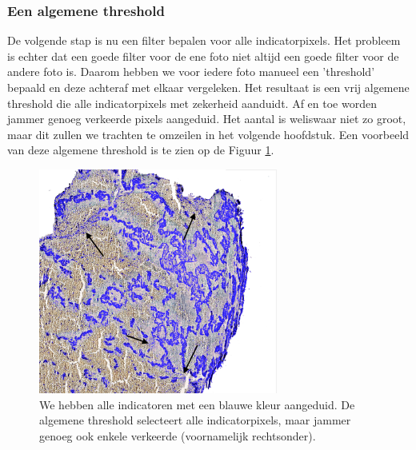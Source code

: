\documentclass[a4paper,kulak]{kulakarticle}
\begin{document}
	\subsubsection{Een algemene threshold}
		De volgende stap is nu een filter bepalen voor alle indicatorpixels. Het probleem is echter dat een goede filter voor de ene foto niet altijd een goede filter voor de andere foto is. Daarom hebben we voor iedere foto manueel een 'threshold' bepaald en deze achteraf met elkaar vergeleken. Het resultaat is een vrij algemene threshold die alle indicatorpixels met zekerheid aanduidt. Af en toe worden jammer genoeg verkeerde pixels aangeduid. Het aantal is weliswaar niet zo groot, maar dit zullen we trachten te omzeilen in het volgende hoofdstuk. Een voorbeeld van deze algemene threshold is te zien op de Figuur \ref{figuur alg_tresh}.
	\begin{figure}[H]
		\centering
		\includegraphics[width = 0.7\textwidth]{algemene_threshold}
		
		\caption{We hebben alle indicatoren met een blauwe kleur aangeduid. De algemene threshold selecteert alle indicatorpixels, maar jammer genoeg ook enkele verkeerde (voornamelijk rechtsonder).}
		\label{figuur alg_tresh}
	\end{figure}
\end{document}
